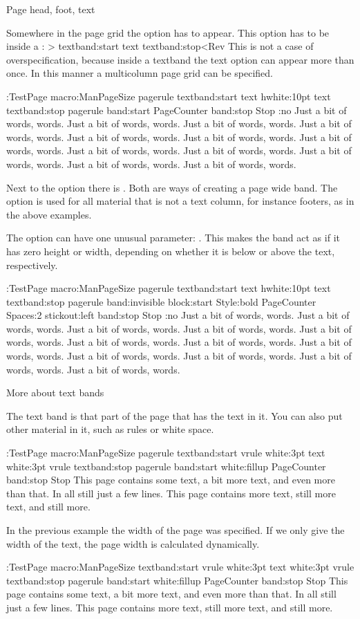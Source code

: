 \Section Page head, foot, text

Somewhere in the page grid the option  has to appear. This
option has to be inside a :
\Ver>    textband:start text textband:stop<Rev
This is not a case of overspecification, because inside a textband
the text option can appear more than once. In this manner a multicolumn
page grid can be specified.

\def\sometext{Just a bit of words, words. }
\edef\sometext{\sometext\sometext\sometext}
\edef\sometext{\sometext\sometext\sometext\sometext}
\OutExample
\DefinePageGrid:TestPage macro:ManPageSize
 pagerule textband:start text hwhite:10pt text textband:stop
 pagerule band:start PageCounter band:stop Stop
\FlushRight:no \sometext
\OutExampleStop

Next to the option  there is .
Both are ways of
creating a page wide band. The option  is used for all
material that is not a text column, for instance footers, as in the
above examples.

The option  can have one unusual parameter: .
This makes the band act as if it has zero height or width, depending
on whether it is below or above the text, respectively.

\OutExample
\DefinePageGrid:TestPage macro:ManPageSize
 pagerule textband:start text hwhite:10pt text textband:stop
 pagerule 
 band:invisible block:start Style:bold PageCounter Spaces:2
     stickout:left band:stop Stop
\FlushRight:no \sometext
\OutExampleStop
 
\SubSection More about text bands

The text band is that part of the page that has the text in it. You can
also put other material in it, such as rules or white space.

\OutExample 
\DefinePageGrid:TestPage macro:ManPageSize pagerule 
 textband:start vrule white:3pt text white:3pt vrule textband:stop 
 pagerule band:start white:fillup PageCounter band:stop Stop
\TestPage This page contains some text, a bit more text,
and even more than that. In all still just a few lines.\EjectPage
This page contains more text, still more text, and still more. 
\OutExampleStop

In the previous example the width of the page was specified.
If we only give the width of the text, the page width is calculated
dynamically. 

\OutExample 
\DefinePageGrid:TestPage macro:ManPageSize
 textband:start vrule white:3pt text white:3pt vrule textband:stop
 pagerule band:start white:fillup PageCounter band:stop Stop
\noindent This page contains some text, a bit more text,
and even more than that. In all still just a few lines.\EjectPage
This page contains more text, still more text, and still more. 
\OutExampleStop

